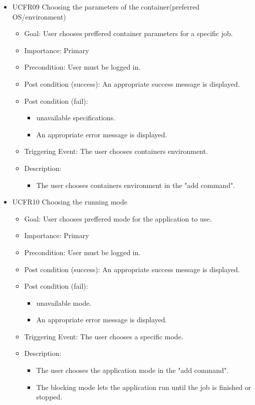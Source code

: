 \begin{itemize}
    \item  UCFR09 Choosing the parameters of the container(preferred OS/environment)
    \begin{itemize}
      \item Goal: User chooses preffered container parameters for a specific job.
      \item Importance: Primary
      \item Precondition: User must be logged in.
      \item Post condition (success): An appropriate success message is displayed.
      \item Post condition (fail):
      \begin{itemize}
        \item unavailable specifications.
        \item An appropriate error message is displayed.
      \end{itemize}
      \item Triggering Event: The user chooses containers environment.
      \item Description:
      \begin{itemize}
        \item The user chooses containers environment in the "add command".
      \end{itemize}
    \end{itemize}

    \item  UCFR10 Choosing the running mode
    \begin{itemize}
      \item Goal: User chooses preffered mode for the application to use.
      \item Importance: Primary
      \item Precondition: User must be logged in.
      \item Post condition (success): An appropriate success message is displayed.
      \item Post condition (fail):
      \begin{itemize}
        \item unavailable mode.
        \item An appropriate error message is displayed.
      \end{itemize}
      \item Triggering Event: The user chooses a specific mode.
      \item Description:
      \begin{itemize}
        \item The user chooses the application mode in the "add command".
        \item The blocking mode lets the application run until the job is finished or stopped.
      \end{itemize}
    \end{itemize}


\end{itemize}
